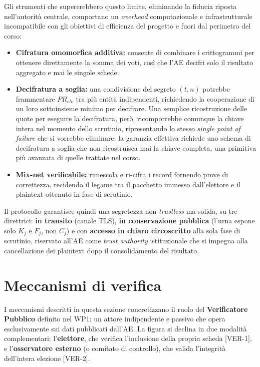 Gli strumenti che supererebbero questo limite, eliminando la fiducia riposta nell'autorità centrale, comportano un \textit{overhead} computazionale e infrastrutturale incompatibile con gli obiettivi di efficienza del progetto e fuori dal perimetro del corso:
\begin{itemize}
    \item \textbf{Cifratura omomorfica additiva:} consente di combinare i crittogrammi per ottenere direttamente la somma dei voti, così che l'AE decifri solo il risultato aggregato e mai le singole schede.
    \item \textbf{Decifratura a soglia:} una condivisione del segreto $(t,n)$ potrebbe frammentare $PR_{ele}$ tra più entità indipendenti, richiedendo la cooperazione di un loro sottoinsieme minimo per decifrare. Una semplice ricostruzione delle quote per eseguire la decifratura, però, ricomporrebbe comunque la chiave intera nel momento dello scrutinio, ripresentando lo stesso \textit{single point of failure} che si vorrebbe eliminare: la garanzia effettiva richiede uno schema di decifratura a soglia che non ricostruisca mai la chiave completa, una primitiva più avanzata di quelle trattate nel corso.
    \item \textbf{Mix-net verificabile:} rimescola e ri-cifra i record fornendo prove di correttezza, recidendo il legame tra il pacchetto immesso dall'elettore e il plaintext ottenuto in fase di scrutinio.
\end{itemize}

Il protocollo garantisce quindi una segretezza non \textit{trustless} ma solida, su tre direttrici: \textbf{in transito} (canale TLS), \textbf{in conservazione pubblica} (l'urna espone solo $K_j$ e $F_j$, non $C_j$) e con \textbf{accesso in chiaro circoscritto} alla sola fase di scrutinio, riservato all'AE come \textit{trust authority} istituzionale che si impegna alla cancellazione dei plaintext dopo il consolidamento del risultato.


\section{Meccanismi di verifica}
\label{sec:meccanismi_verifica}

I meccanismi descritti in questa sezione concretizzano il ruolo del \textbf{Verificatore Pubblico} definito nel WP1: un attore indipendente e passivo che opera esclusivamente sui dati pubblicati dall'AE. La figura si declina in due modalità complementari: l'\textbf{elettore}, che verifica l'inclusione della propria scheda [VER-1], e l'\textbf{osservatore esterno} (o comitato di controllo), che valida l'integrità dell'intera elezione [VER-2].


